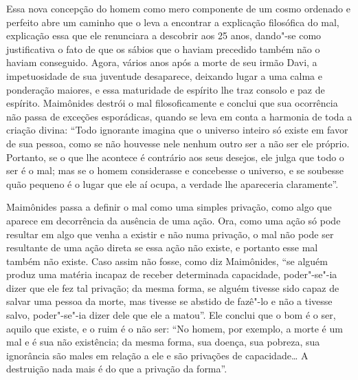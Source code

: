 Essa nova concepção do homem como mero componente de um cosmo ordenado e
perfeito abre um caminho que o leva a encontrar a explicação filosófica
do mal, explicação essa que ele renunciara a descobrir aos 25 anos,
dando"-se como justificativa o fato de que os sábios que o haviam
precedido também não o haviam conseguido. Agora, vários anos após a
morte de seu irmão Davi, a impetuosidade de sua juventude desaparece,
deixando lugar a uma calma e ponderação maiores, e essa maturidade de
espírito lhe traz consolo e paz de espírito. Maimônides destrói o mal
filosoficamente e conclui que sua ocorrência não passa de exceções
esporádicas, quando se leva em conta a harmonia de toda a criação
divina: ``Todo ignorante imagina que o universo inteiro só existe em favor 
de sua pessoa, como se não houvesse nele nenhum
outro ser a não ser ele próprio. Portanto, se o que lhe acontece é
contrário aos seus desejos, ele julga que todo o ser é o mal; mas se o
homem considerasse e concebesse o universo, e se soubesse quão pequeno é
o lugar que ele aí ocupa, a verdade lhe apareceria claramente''.

Maimônides passa a definir o mal como uma simples privação, como algo
que aparece em decorrência da ausência de uma ação. Ora, como uma ação
só pode resultar em algo que venha a existir e não numa privação, o mal
não pode ser resultante de uma ação direta se essa ação não existe, e
portanto esse mal também não existe. Caso assim não fosse, como diz
Maimônides, ``se alguém produz uma matéria incapaz de receber
determinada capacidade, poder"-se"-ia dizer que ele fez tal privação; da
mesma forma, se alguém tivesse sido capaz de salvar uma pessoa da
morte, mas tivesse se abstido de fazê"-lo e não a tivesse salvo,
poder"-se"-ia dizer dele que ele a matou''. Ele conclui que o bom é o ser,
aquilo que existe, e o ruim é o não ser: ``No homem, por exemplo, a
morte é um mal e é sua não existência; da mesma forma, sua doença, sua
pobreza, sua ignorância são males em relação a ele e são privações de
capacidade\ldots{} A destruição nada mais é do que a privação da forma''.

